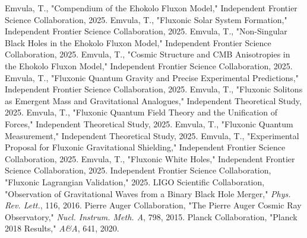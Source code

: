 \documentclass[11pt]{article}
\begin{document}
\begin{thebibliography}{9}
Emvula, T., "Compendium of the Ehokolo Fluxon Model," Independent Frontier Science Collaboration, 2025.
Emvula, T., "Fluxonic Solar System Formation," Independent Frontier Science Collaboration, 2025.
Emvula, T., "Non-Singular Black Holes in the Ehokolo Fluxon Model," Independent Frontier Science Collaboration, 2025.
Emvula, T., "Cosmic Structure and CMB Anisotropies in the Ehokolo Fluxon Model," Independent Frontier Science Collaboration, 2025.
Emvula, T., "Fluxonic Quantum Gravity and Precise Experimental Predictions," Independent Frontier Science Collaboration, 2025.
Emvula, T., "Fluxonic Solitons as Emergent Mass and Gravitational Analogues," Independent Theoretical Study, 2025.
Emvula, T., "Fluxonic Quantum Field Theory and the Unification of Forces," Independent Theoretical Study, 2025.
Emvula, T., "Fluxonic Quantum Measurement," Independent Theoretical Study, 2025.
Emvula, T., "Experimental Proposal for Fluxonic Gravitational Shielding," Independent Frontier Science Collaboration, 2025.
Emvula, T., "Fluxonic White Holes," Independent Frontier Science Collaboration, 2025.
Independent Frontier Science Collaboration, "Fluxonic Lagrangian Validation," 2025.
LIGO Scientific Collaboration, "Observation of Gravitational Waves from a Binary Black Hole Merger," \textit{Phys. Rev. Lett.}, 116, 2016.
Pierre Auger Collaboration, "The Pierre Auger Cosmic Ray Observatory," \textit{Nucl. Instrum. Meth. A}, 798, 2015.
Planck Collaboration, "Planck 2018 Results," \textit{A\&A}, 641, 2020.
\end{thebibliography}
\end{document}
